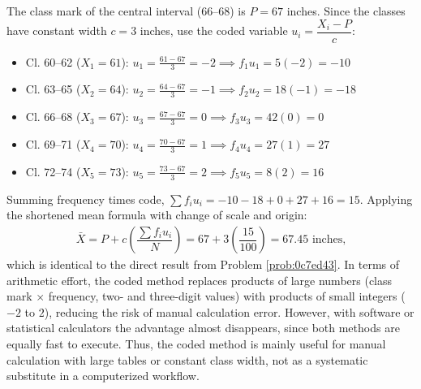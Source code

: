 \begin{solproblema}
	The class mark of the central interval (66--68) is $P = 67$ inches. Since the classes have constant width $c = 3$ inches, use the coded variable $u_{i} = \dfrac{X_{i} - P}{c}$:
	\begin{itemize}
		\item Cl. 60--62 ($X_{1}=61$): $u_{1} = \frac{61-67}{3} = -2 \implies f_{1}u_{1} = 5(-2) = -10$
		\item Cl. 63--65 ($X_{2}=64$): $u_{2} = \frac{64-67}{3} = -1 \implies f_{2}u_{2} = 18(-1) = -18$
		\item Cl. 66--68 ($X_{3}=67$): $u_{3} = \frac{67-67}{3} = 0 \implies f_{3}u_{3} = 42(0) = 0$
		\item Cl. 69--71 ($X_{4}=70$): $u_{4} = \frac{70-67}{3} = 1 \implies f_{4}u_{4} = 27(1) = 27$
		\item Cl. 72--74 ($X_{5}=73$): $u_{5} = \frac{73-67}{3} = 2 \implies f_{5}u_{5} = 8(2) = 16$
	\end{itemize}
	Summing frequency times code, $\sum f_{i}u_{i} = -10 - 18 + 0 + 27 + 16 = 15$. Applying the shortened mean formula with change of scale and origin:
	\begin{align}
		\bar{X} = P + c\left( \dfrac{\sum f_{i}u_{i}}{N} \right) = 67 + 3\left( \dfrac{15}{100} \right) = 67.45 \text{ inches,}
	\end{align}
	which is identical to the direct result from Problem \ref{prob:0c7ed43}. In terms of arithmetic effort, the coded method replaces products of large numbers (class mark $\times$ frequency, two- and three-digit values) with products of small integers ($-2$ to $2$), reducing the risk of manual calculation error. However, with software or statistical calculators the advantage almost disappears, since both methods are equally fast to execute. Thus, the coded method is mainly useful for manual calculation with large tables or constant class width, not as a systematic substitute in a computerized workflow.
\end{solproblema}

